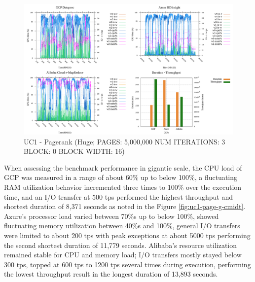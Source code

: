 \documentclass[review]{elsarticle}
\begin{document}
	\begin{figure}[p]
		\caption{UC1 - Pagerank (Huge; PAGES: 5,000,000 NUM ITERATIONS: 3 BLOCK: 0 BLOCK WIDTH: 16)}
		\label{fig:uc1-page-h-cmidt}
		\includegraphics[width=\textwidth]{uc1-page-h-cmidt}
		\centering
	\end{figure}
	
	When assessing the benchmark performance in gigantic scale, the CPU load of GCP was measured in a range of about 60\% up to below 100\%, a fluctuating RAM utilization behavior incremented three times to 100\% over the execution time, and an I/O transfer at 500 tps performed the highest throughput and shortest duration of 8,371 seconds as noted in the Figure \ref{fig:uc1-page-g-cmidt}. Azure's processor load varied between 70\%s up to below 100\%, showed fluctuating memory utilization between 40\%s and 100\%, general I/O transfers were limited to about 200 tps with peak exceptions at about 5000 tps performing the second shortest duration of 11,779 seconds. Alibaba's resource utilization remained stable for CPU and memory load; I/O transfers mostly stayed below 300 tps, topped at 600 tps to 1200 tps several times during execution, performing the lowest throughput result in the longest duration of 13,893 seconds.
	
\end{document}
